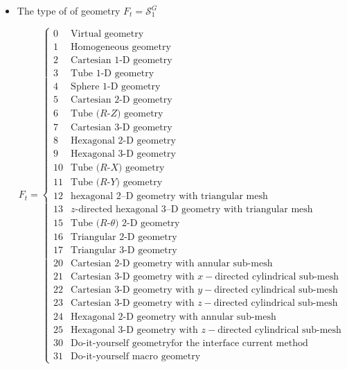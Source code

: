 \begin{itemize}
\item The type of of geometry $F_{t}=\mathcal{S}^{G}_{1}$

\begin{displaymath}
F_{t} = \left\{
\begin{array}{rl}
 0 & \textrm{Virtual geometry} \\
 1 & \textrm{Homogeneous geometry} \\ 
 2 & \textrm{Cartesian 1-D geometry}\\ 
 3 & \textrm{Tube 1-D geometry} \\
 4 & \textrm{Sphere 1-D geometry} \\
 5 & \textrm{Cartesian 2-D geometry} \\
 6 & \textrm{Tube ($R$-$Z$) geometry} \\
 7 & \textrm{Cartesian 3-D geometry} \\
 8 & \textrm{Hexagonal 2-D geometry}  \\
 9 & \textrm{Hexagonal 3-D geometry} \\
10 & \textrm{Tube ($R$-$X$) geometry} \\
11 & \textrm{Tube ($R$-$Y$) geometry} \\
12 & \textrm{hexagonal 2--D geometry with triangular mesh} \\
13 & \textrm{$z$-directed hexagonal 3--D geometry with triangular mesh} \\
15 & \textrm{Tube ($R$-$\theta$) 2-D geometry} \\
16 & \textrm{Triangular 2-D geometry} \\
17 & \textrm{Triangular 3-D geometry} \\
20 & \textrm{Cartesian 2-D geometry with annular sub-mesh} \\
21 & \textrm{Cartesian 3-D geometry with $x-$directed cylindrical sub-mesh} \\
22 & \textrm{Cartesian 3-D geometry with $y-$directed cylindrical sub-mesh} \\
23 & \textrm{Cartesian 3-D geometry with $z-$directed cylindrical sub-mesh} \\
24 & \textrm{Hexagonal 2-D geometry with annular sub-mesh} \\
25 & \textrm{Hexagonal 3-D geometry with $z-$directed cylindrical sub-mesh } \\
30 & \textrm{Do-it-yourself geometryfor the interface current method} \\
31 & \textrm{Do-it-yourself macro geometry}
\end{array} \right.
\end{displaymath}
\eject


\end{itemize}

